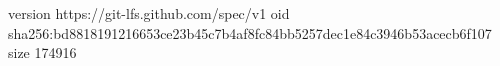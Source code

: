 version https://git-lfs.github.com/spec/v1
oid sha256:bd8818191216653ce23b45c7b4af8fc84bb5257dec1e84c3946b53acecb6f107
size 174916
